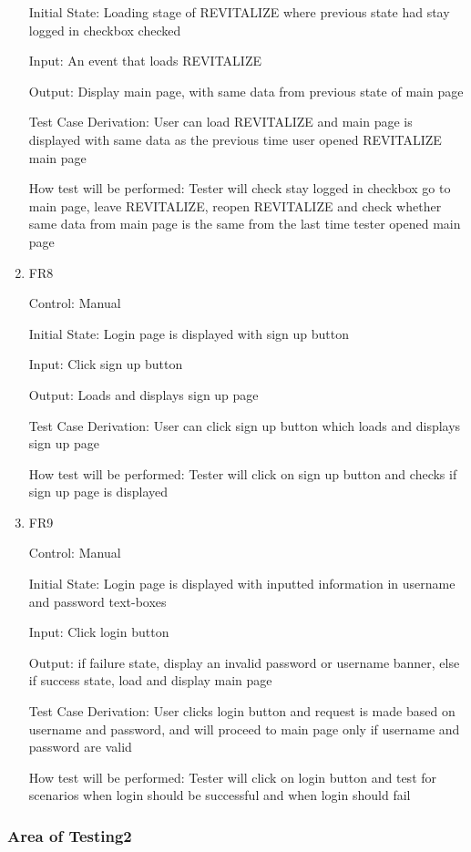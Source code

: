 \documentclass[12pt, titlepage]{article}
\begin{document}
\begin{enumerate}
Initial State: Loading stage of REVITALIZE where previous state had stay logged in checkbox checked
					
Input: An event that loads REVITALIZE
					
Output: Display main page, with same data from previous state of main page

Test Case Derivation: User can load REVITALIZE and main page is displayed with same data as the previous time user opened REVITALIZE main page

How test will be performed: Tester will check stay logged in checkbox go to main page, leave REVITALIZE, reopen REVITALIZE and check whether same data from main page is the same from the last time tester opened main page

\item{FR8\\}

Control: Manual
					
Initial State: Login page is displayed with sign up button
					
Input: Click sign up button
					
Output: Loads and displays sign up page

Test Case Derivation: User can click sign up button which loads and displays sign up page

How test will be performed: Tester will click on sign up button and checks if sign up page is displayed

\item{FR9\\}

Control: Manual
					
Initial State: Login page is displayed with inputted information in username and password text-boxes
					
Input: Click login button
					
Output: if failure state, display an invalid password or username banner, else if success state, load and display main page

Test Case Derivation: User clicks login button and request is made based on username and password, and will proceed to main page only if username and password are valid

How test will be performed: Tester will click on login button and test for scenarios when login should be successful and when login should fail

\end{enumerate}

\subsubsection{Area of Testing2}
\end{document}
